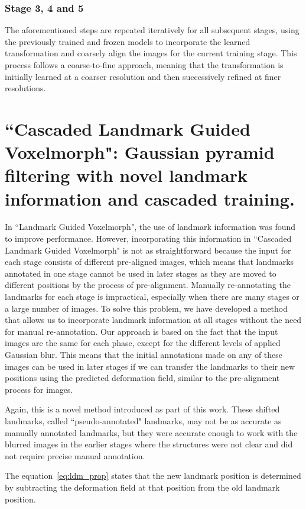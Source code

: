 \documentclass{book}
\begin{document}
	\subsubsection{Stage 3, 4 and 5}
	The aforementioned steps are repeated iteratively for all subsequent stages, using the previously trained and frozen models to incorporate the learned transformation and coarsely align the images for the current training stage. This process follows a coarse-to-fine approach, meaning that the transformation is initially learned at a coarser resolution and then successively refined at finer resolutions.
	
	\section{``Cascaded Landmark Guided Voxelmorph": Gaussian pyramid filtering with novel landmark information and cascaded training.}
	In ``Landmark Guided Voxelmorph", the use of landmark information was found to improve performance. However, incorporating this information in ``Cascaded Landmark Guided Voxelmorph" is not as straightforward because the input for each stage consists of different pre-aligned images, which means that landmarks annotated in one stage cannot be used in later stages as they are moved to different positions by the process of pre-alignment. Manually re-annotating the landmarks for each stage is impractical, especially when there are many stages or a large number of images. To solve this problem, we have developed a method that allows us to incorporate landmark information at all stages without the need for manual re-annotation. Our approach is based on the fact that the input images are the same for each phase, except for the different levels of applied Gaussian blur. This means that the initial annotations made on any of these images can be used in later stages if we can transfer the landmarks to their new positions using the predicted deformation field, similar to the pre-alignment process for images.
	
	Again, this is a novel method introduced as part of this work. These shifted landmarks, called ``pseudo-annotated" landmarks, may not be as accurate as manually annotated landmarks, but they were accurate enough to work with the blurred images in the earlier stages where the structures were not clear and did not require precise manual annotation.
	
	The equation~\ref{eq:ldm_prop} states that the new landmark position is determined by subtracting the deformation field at that position from the old landmark position.
	
\end{document}

